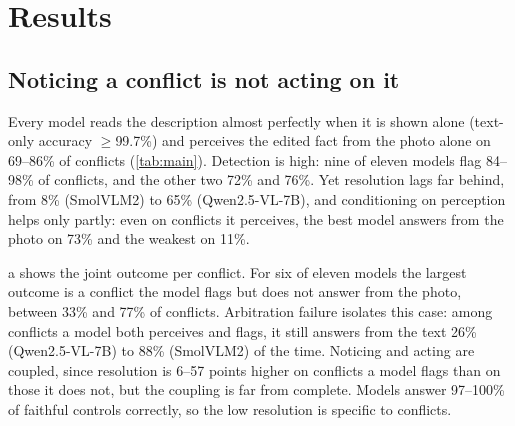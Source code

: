 \section{Results}
\label{sec:results}

\begin{table}[t]
\centering
\small
\setlength{\tabcolsep}{4.5pt}

\caption{\textbf{Main results} on 1,800 conflicts and 201 controls per model (\%). Perc.: answers from the image with no description. Flag: flags the conflict; FA: flags a faithful control (lower is better); Det.: Flag minus FA. Res.: answers from the image with the description present; Res.$|$P: the same among conflicts the model perceives; ArbF: perceives and flags the conflict yet answers from the text (lower is better); Focus: Res. when told to rely on the image. Span/Input/Strict: attribution report names the edited words / names the text as the wrong input / gets all four fields right. Best in bold. 95\% image-clustered bootstrap intervals are at most $\pm$3.1 points for conflict metrics and $\pm$7.8 points for FA and Det.}
\label{tab:main}
\end{table}

\subsection{Noticing a conflict is not acting on it}
\label{sec:gap}

Every model reads the description almost perfectly when it is shown alone (text-only accuracy $\geq$99.7\%) and perceives the edited fact from the photo alone on 69--86\% of conflicts (\cref{tab:main}). Detection is high: nine of eleven models flag 84--98\% of conflicts, and the other two 72\% and 76\%. Yet resolution lags far behind, from 8\% (SmolVLM2) to 65\% (Qwen2.5-VL-7B), and conditioning on perception helps only partly: even on conflicts it perceives, the best model answers from the photo on 73\% and the weakest on 11\%.

a shows the joint outcome per conflict. For six of eleven models the largest outcome is a conflict the model flags but does not answer from the photo, between 33\% and 77\% of conflicts. Arbitration failure isolates this case: among conflicts a model both perceives and flags, it still answers from the text 26\% (Qwen2.5-VL-7B) to 88\% (SmolVLM2) of the time. Noticing and acting are coupled, since resolution is 6--57 points higher on conflicts a model flags than on those it does not, but the coupling is far from complete. Models answer 97--100\% of faithful controls correctly, so the low resolution is specific to conflicts.

